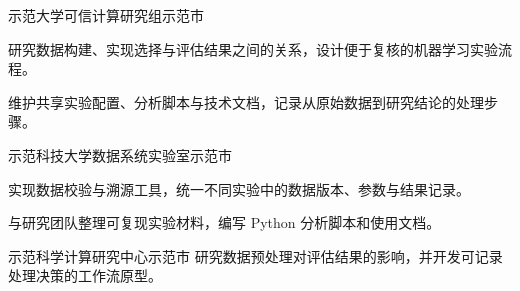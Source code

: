   {示范大学可信计算研究组}{示范市}{
  \begin{cvitems}
    \item 研究数据构建、实现选择与评估结果之间的关系，设计便于复核的机器学习实验流程。
    \item 维护共享实验配置、分析脚本与技术文档，记录从原始数据到研究结论的处理步骤。
  \end{cvitems}
}
  {示范科技大学数据系统实验室}{示范市}{
  \begin{cvitems}
    \item 实现数据校验与溯源工具，统一不同实验中的数据版本、参数与结果记录。
    \item 与研究团队整理可复现实验材料，编写 Python 分析脚本和使用文档。
  \end{cvitems}
}
  {示范科学计算研究中心}{示范市}{
  研究数据预处理对评估结果的影响，并开发可记录处理决策的工作流原型。
}
